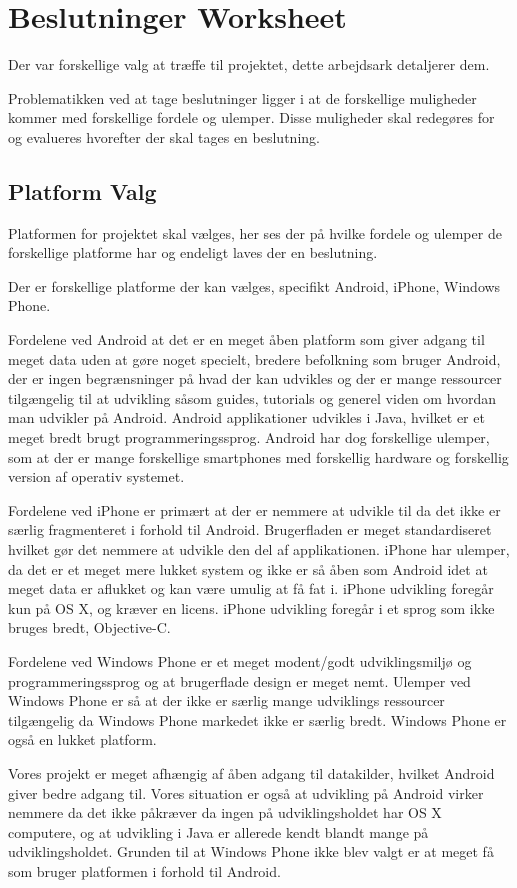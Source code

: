 \chapter{Beslutninger Worksheet}
Der var forskellige valg at træffe til projektet, dette arbejdsark detaljerer dem.
 
Problematikken ved at tage beslutninger ligger i at de forskellige muligheder kommer med forskellige fordele og ulemper.
Disse muligheder skal redegøres for og evalueres hvorefter der skal tages en beslutning.

\section{Platform Valg}
Platformen for projektet skal vælges, her ses der på hvilke fordele og ulemper de forskellige platforme har og endeligt laves der en beslutning.

Der er forskellige platforme der kan vælges, specifikt Android, iPhone, Windows Phone. 

Fordelene ved Android at det er en meget åben platform som giver adgang til meget data uden at gøre noget specielt, bredere befolkning som bruger Android, der er ingen begrænsninger på hvad der kan udvikles og der er mange ressourcer tilgængelig til at udvikling såsom guides, tutorials og generel viden om hvordan man udvikler på Android. Android applikationer udvikles i Java, hvilket er et meget bredt brugt programmeringssprog.
Android har dog forskellige ulemper, som at der er mange forskellige smartphones med forskellig hardware og forskellig version af operativ systemet. 

Fordelene ved iPhone er primært at der er nemmere at udvikle til da det ikke er særlig fragmenteret i forhold til Android. Brugerfladen er meget standardiseret hvilket gør det nemmere at udvikle den del af applikationen. 
iPhone har ulemper, da det er et meget mere lukket system og ikke er så åben som Android idet at meget data er aflukket og kan være umulig at få fat i. iPhone udvikling foregår kun på OS X, og kræver en licens. iPhone udvikling foregår i et sprog som ikke bruges bredt, Objective-C.

Fordelene ved Windows Phone er et meget modent/godt udviklingsmiljø og programmeringssprog og at brugerflade design er meget nemt. 
Ulemper ved Windows Phone er så at der ikke er særlig mange udviklings ressourcer tilgængelig da Windows Phone markedet ikke er særlig bredt. Windows Phone er også en lukket platform.

Vores projekt er meget afhængig af åben adgang til datakilder, hvilket Android giver bedre adgang til. Vores situation er også at udvikling på Android virker nemmere da det ikke påkræver da ingen på udviklingsholdet har OS X computere, og at udvikling i Java er allerede kendt blandt mange på udviklingsholdet. Grunden til at Windows Phone ikke blev valgt er at meget få som bruger platformen i forhold til Android.

